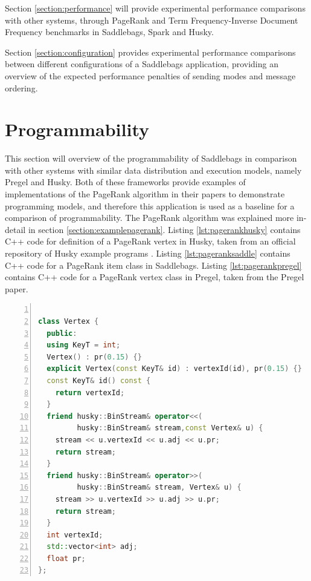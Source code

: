 \documentclass{uit-report}
\begin{document}
Section \ref{section:performance} will provide experimental performance comparisons with other systems, through PageRank and Term Frequency-Inverse Document Frequency benchmarks in Saddlebags, Spark and Husky.

Section \ref{section:configuration} provides experimental performance comparisons between different configurations of a Saddlebags application, providing an overview of the expected performance penalties of sending modes and message ordering.

\newpage
\section{Programmability}\label{section:programmability}
This section will overview of the programmability of Saddlebags in comparison with other systems with similar data distribution and execution models, namely Pregel and Husky. Both of these frameworks provide examples of implementations of the PageRank algorithm in their papers \cite{husky, pregel} to demonstrate programming models, and therefore this application is used as a baseline for a comparison of programmability. The PageRank algorithm was explained more in-detail in section \ref{section:examplepagerank}. Listing \ref{lst:pagerankhusky} contains C++ code for definition of a PageRank vertex in Husky, taken from an official repository of Husky example programs \cite{huskyexample}. Listing \ref{lst:pageranksaddle} contains C++ code for a PageRank item class in Saddlebags. Listing \ref{lst:pagerankpregel} contains C++ code for a PageRank vertex class in Pregel, taken from the Pregel paper. 

\begin{lstlisting}[label={lst:pagerankhusky}, float=h!,frame=tlrb,numbers=left, caption={PageRank vertex class in Husky}, captionpos=t, language=c++, showstringspaces=false]

class Vertex {
  public:
  using KeyT = int;
  Vertex() : pr(0.15) {}
  explicit Vertex(const KeyT& id) : vertexId(id), pr(0.15) {}
  const KeyT& id() const {
    return vertexId;
  }
  friend husky::BinStream& operator<<(
         husky::BinStream& stream,const Vertex& u) {
    stream << u.vertexId << u.adj << u.pr;
    return stream;
  }
  friend husky::BinStream& operator>>(
         husky::BinStream& stream, Vertex& u) {
    stream >> u.vertexId >> u.adj >> u.pr;
    return stream;
  }
  int vertexId;
  std::vector<int> adj;
  float pr;
};
\end{lstlisting}
\end{document}
